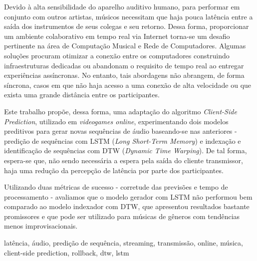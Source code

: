 \resumo
{}

Devido à alta sensibilidade do aparelho auditivo humano, para performar em conjunto com outros artistas, músicos necessitam que haja pouca latência entre a saída dos instrumentos de seus colegas e seu retorno. Dessa forma, proporcionar um ambiente colaborativo em tempo real via Internet torna-se um desafio pertinente na área de Computação Musical e Rede de Computadores. Algumas soluções procuram otimizar a conexão entre os computadores construindo infraestruturas dedicadas ou abandonam o requisito de tempo real ao entregar experiências assíncronas. No entanto, tais abordagens não abrangem, de forma síncrona, casos em que não haja acesso a uma conexão de alta velocidade ou que exista uma grande distância entre os participantes.

Este trabalho propõe, dessa forma, uma adaptação do algoritmo \textit{Client-Side Prediction}, utilizado em \textit{videogames online}, experimentando dois modelos preditivos para gerar novas sequências de áudio baseando-se nas anteriores - predição de sequências com LSTM (\textit{Long Short-Term Memory}) e indexação e identificação de sequências com DTW (\textit{Dynamic Time Warping}). De tal forma, espera-se que, não sendo necessária a espera pela saída do cliente transmissor, haja uma redução da percepção de latência por parte dos participantes.

Utilizando duas métricas de sucesso - corretude das previsões e tempo de processamento - avaliamos que o modelo gerador com LSTM não performou bem comparado ao modelo indexador com DTW, que apresentou resultados bastante promissores e que pode ser utilizado para músicas de gêneros com tendências menos improvisacionais.

\begin{keywords}
latência, áudio, predição de sequência, streaming, transmissão, online, música, client-side prediction, rollback, dtw, lstm
\end{keywords}
